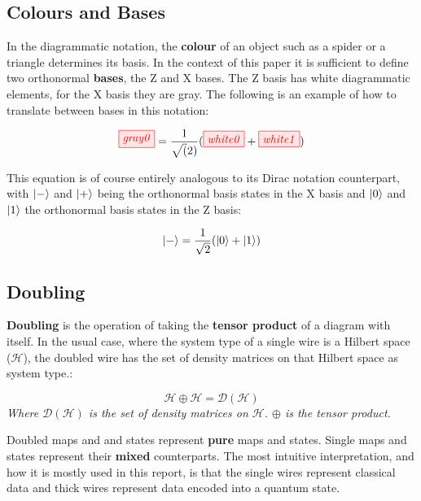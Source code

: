 \documentclass[]{article}
\begin{document}
\subsection{Colours and Bases}
\label{coloursandbases}

In the diagrammatic notation, the \textbf{colour} of an object such as a spider or a triangle determines its basis. In the context of this paper it is sufficient to define two orthonormal \textbf{bases}, the Z and X bases. The Z basis has white diagrammatic elements, for the X basis they are gray. The following is an example of how to translate between bases in this notation:

\begin{equation}
\tikzfig{gray0} =\frac{1}{\sqrt(2)}( \tikzfig{white0} + \tikzfig{white1})
\end{equation}

This equation is of course entirely analogous to its Dirac notation counterpart, with $\ket{-}$ and $\ket{+}$ being the orthonormal basis states in the X basis and $\ket{0}$ and $\ket{1}$ the orthonormal basis states in the Z basis:

\begin{equation}
\ket{-} = \frac{1}{\sqrt{2}}(\ket{0} + \ket{1})
\end{equation}

\subsection{Doubling}
\label{doubling}

\textbf{Doubling} is the operation of taking the \textbf{tensor product} of a diagram with itself. In the usual case, where the system type of a single wire is a Hilbert space ($\mathcal{H}$), the doubled wire has the set of density matrices on that Hilbert space as system type.:

\begin{equation}
\mathcal{H} \oplus \mathcal{H} = \mathcal{D}(\mathcal{H})
\end{equation}
\textit{Where $\mathcal{D}(\mathcal{H})$ is the set of density matrices on $\mathcal{H}$. $\oplus$ is the tensor product.}

Doubled maps and and states represent \textbf{pure} maps and states. Single maps and states represent their \textbf{mixed} counterparts. The most intuitive interpretation, and how it is mostly used in this report, is that the single wires represent classical data and thick wires represent data encoded into a quantum state.
\end{document}
